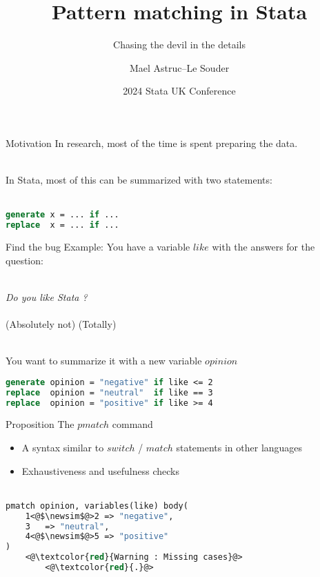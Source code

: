 \documentclass[11pt]{beamer}
\title{Pattern matching in Stata}
\subtitle{Chasing the devil in the details}
\author[Mael Astruc--Le Souder]{Mael Astruc--Le Souder}
\institute[BSE]{Bordeaux School of Economics, France}
\date{2024 Stata UK Conference}
\let\newsim\sim
\renewcommand{\newsim}{\mathrel{\mathpalette\bueckirel\sim}}
\newcommand{\bueckirel}[2]{%
  \raisebox{\depth}{\scalebox{0.808}{$#1#2$}}%
}
\begin{document}
\maketitle

\begin{frame}[fragile]{Motivation}
In research, most of the time is spent preparing the data. \\~

In Stata, most of this can be summarized with two statements: \\~
\begin{lstlisting}[language=Stata]
generate x = ... if ...
replace  x = ... if ...
\end{lstlisting}
\end{frame}

\begin{frame}[fragile]{Find the bug}
Example: You have a variable $like$ with the answers for the question: \\~

\qquad \textit{Do you like Stata ?} \\

\qquad \quad {}     \\
\qquad (Absolutely not) \qquad \qquad \qquad (Totally) \\~

You want to summarize it with a new variable $opinion$ \\
\begin{lstlisting}[language=Stata]
generate opinion = "negative" if like <= 2
replace  opinion = "neutral"  if like == 3
replace  opinion = "positive" if like >= 4
\end{lstlisting}
\end{frame}

\begin{frame}[fragile]{Proposition}
The $pmatch$ command
\begin{itemize}
    \item A syntax similar to $switch$ / $match$ statements in other languages
    \item Exhaustiveness and usefulness checks \\~
\end{itemize}

\begin{lstlisting}[language=Stata]
pmatch opinion, variables(like) body(
    1<@$\newsim$@>2 => "negative",
    3   => "neutral",
    4<@$\newsim$@>5 => "positive"
)
    <@\textcolor{red}{Warning : Missing cases}@>
        <@\textcolor{red}{.}@>
\end{lstlisting}
\end{frame}
\end{document}
